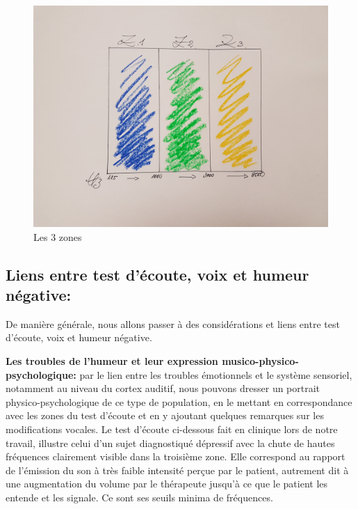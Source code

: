 \begin{figure}
	\centering
	\includegraphics[width=1\linewidth]{images/les3zones.jpg}
	\caption[Les 3 zones]{Les 3 zones}
	\label{Les trois zones du test d'écoute}
\end{figure}
 \clearpage

\subsection{Liens entre test d'écoute, voix et 
humeur négative:}
De manière générale, nous allons passer  à  des considérations et liens entre test d'écoute, voix  et 
humeur négative.


\textbf{Les troubles de l'humeur et leur expression
	musico-phy\-sico-psy\-cho\-lo\-gi\-que:} par le lien entre les troubles
émotionnels et le
système sensoriel, notamment au niveau du cortex auditif, nous
pouvons dresser un portrait
physico-psychologique de ce type de population,
en le mettant en correspondance avec les zones du test d'écoute et
en y ajoutant quelques remarques sur les modifications vocales.
Le test d'écoute ci-dessous fait en clinique lors de notre travail,  illustre
celui d'un sujet diagnostiqué dépressif avec la
chute  de hautes fréquences 
clairement visible dans la troisième zone. Elle correspond au rapport de l'émission du son à
très faible intensité perçue par le
patient, autrement dit à une augmentation
du volume
par le thérapeute jusqu'à ce que le patient les entende et les signale.
Ce sont ses seuils minima de fréquences.


